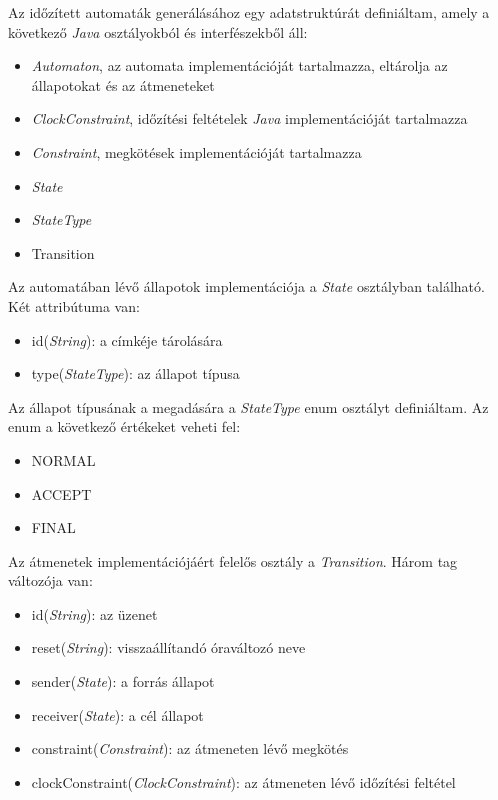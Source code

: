 Az időzített automaták generálásához egy adatstruktúrát definiáltam, amely a következő \textit{Java} osztályokból és interfészekből áll:
\begin{itemize}
    \item \textit{Automaton}, az automata implementációját tartalmazza, eltárolja az állapotokat és az átmeneteket
    \item \textit{ClockConstraint}, időzítési feltételek \textit{Java} implementációját tartalmazza
    \item \textit{Constraint}, megkötések implementációját tartalmazza
    \item \textit{State}
    \item \textit{StateType}
    \item Transition
\end{itemize}

Az automatában lévő állapotok implementációja a \textit{State} osztályban található.
Két attribútuma van:
\begin{itemize}
	\item id(\textit{String}): a címkéje tárolására
	\item type(\textit{StateType}): az állapot típusa
\end{itemize}

Az állapot típusának a megadására a \textit{StateType} enum osztályt definiáltam.
Az enum a következő értékeket veheti fel:
\begin{itemize}
	\item NORMAL
	\item ACCEPT
	\item FINAL
\end{itemize}

Az átmenetek implementációjáért felelős osztály a \textit{Transition}.
Három tag változója van:
\begin{itemize}
	\item id(\textit{String}): az üzenet
	\item reset(\textit{String}): visszaállítandó óraváltozó neve
	\item sender(\textit{State}): a forrás állapot
	\item receiver(\textit{State}): a cél állapot
	\item constraint(\textit{Constraint}): az átmeneten lévő megkötés
	\item clockConstraint(\textit{ClockConstraint}): az átmeneten lévő időzítési feltétel
\end{itemize}

